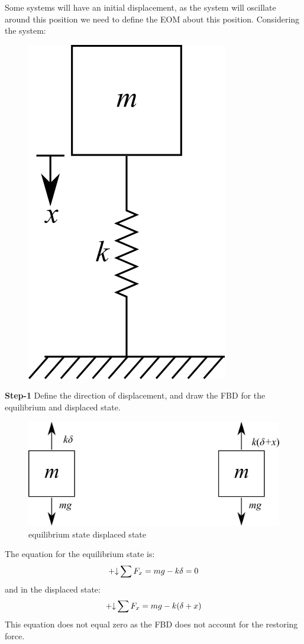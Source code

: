 \documentclass[12pt,letter]{article}
\begin{document}
		\begin{example}	
			Some systems will have an initial displacement, as the system will oscillate around this position we need to define the EOM about this position. Considering the system:
			\begin{figure}[H]
				\centering
				\includegraphics[]{../figures/1-DOF-spring_mass_vertical.png}
			\end{figure}		
			\noindent \textbf{Step-1}
			Define the direction of displacement, and draw the FBD for the equilibrium and displaced state.  
			\begin{figure}[H]
				\centering
				\includegraphics[]{../figures/1-DOF-spring_mass_vertical_FBD.png}\\
				equilibrium state \hspace{3cm} displaced state
			\end{figure}		
			\noindent The equation for the equilibrium state is:
			\begin{equation}
				\mathbin{+\mathord\downarrow} \sum F_x = mg - k\delta = 0
			\end{equation}
			and in the displaced state:
			\begin{equation}
				\mathbin{+\mathord\downarrow} \sum F_x =mg -k(\delta + x)
			\end{equation}	
			This equation does not equal zero as the FBD does not account for the restoring force.	
			

\end{example}
\end{document}
